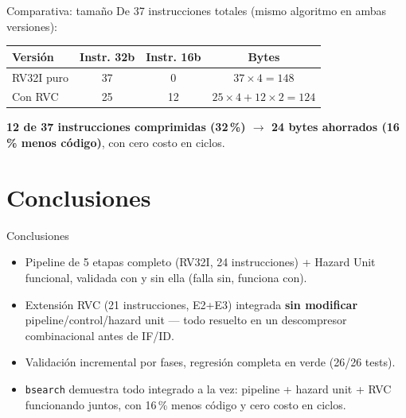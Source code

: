 \documentclass{beamer}
\begin{document}
\begin{frame}{Comparativa: tamaño}
  De 37 instrucciones totales (mismo algoritmo en ambas versiones):
  \begin{table}
    \centering
    \small
    \begin{tabular}{@{}lccc@{}}
      \toprule
      \textbf{Versión} & \textbf{Instr. 32b} & \textbf{Instr. 16b} & \textbf{Bytes} \\
      \midrule
      RV32I puro & 37 & 0 & $37\times4=148$ \\
      Con RVC & 25 & 12 & $25\times4+12\times2=124$ \\
      \bottomrule
    \end{tabular}
  \end{table}
  \begin{center}
    \textbf{12 de 37 instrucciones comprimidas (32\,\%) $\to$ 24 bytes
    ahorrados (16\,\% menos código)}, con cero costo en ciclos.
  \end{center}
\end{frame}

\section{Conclusiones}

\begin{frame}{Conclusiones}
  \begin{itemize}
    \item<1-> Pipeline de 5 etapas completo (RV32I, 24 instrucciones) +
      Hazard Unit funcional, validada con y sin ella (falla sin, funciona
      con).
    \item<2-> Extensión RVC (21 instrucciones, E2+E3) integrada
      \textbf{sin modificar} pipeline/control/hazard unit --- todo resuelto
      en un descompresor combinacional antes de IF/ID.
    \item<3-> Validación incremental por fases, regresión completa en verde
      (26/26 tests).
    \item<4-> \texttt{bsearch} demuestra todo integrado a la vez: pipeline +
      hazard unit + RVC funcionando juntos, con 16\,\% menos código y cero
      costo en ciclos.
  \end{itemize}
\end{frame}
\end{document}

